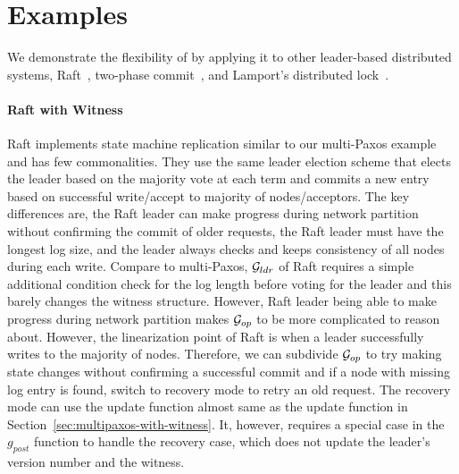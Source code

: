 \section{Examples}
\label{sec:examples}

We demonstrate the flexibility of \sysname{} by applying it to other leader-based distributed systems, Raft~\cite{raft}, two-phase commit~\cite{distsys}, and Lamport's distributed
lock~\cite{lamportclock}.

\paragraph{Raft with Witness}
Raft implements state machine replication similar to our multi-Paxos example and
has few commonalities. They use the same leader election scheme that elects
the leader based on the majority vote at each term and commits a new entry based on
successful write/accept to majority of nodes/acceptors. The key differences are, 
the Raft leader can make progress during network partition without confirming the 
commit of older requests, the Raft leader must have the longest log size, and 
the leader always checks and keeps consistency of all nodes during each write.
Compare to multi-Paxos, $\mathcal{G}_{ldr}$ of Raft requires a simple additional
condition check for the log length before voting for the leader and this barely
changes the witness structure. However, Raft leader being able to make progress
during network partition makes $\mathcal{G}_{op}$ to be more complicated to
reason about. However, the linearization point of Raft is when a leader
successfully writes to the majority of nodes. Therefore, we can subdivide
$\mathcal{G}_{op}$ to try making state changes without confirming a successful
commit and if a node with missing log entry is found, switch to recovery mode
to retry an old request. The recovery mode can use the update function almost same 
as the update function in Section~\ref{sec:multipaxos-with-witness}. It, however, 
requires a special case in the $g_{post}$ function to handle the recovery case, 
which does not update the leader's version number and the witness.  

